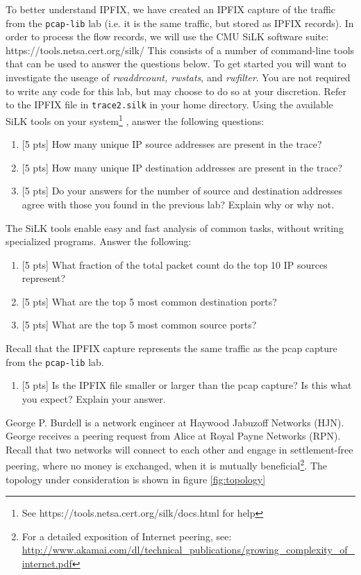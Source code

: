 To better understand IPFIX, we have created an IPFIX capture of the traffic from the {\tt pcap-lib} lab (i.e. it is the same traffic, but stored as IPFIX records).
In order to process the flow records, we will use the CMU SiLK software suite:
   https://tools.netsa.cert.org/silk/
This consists of a number of command-line tools that can be used to answer the questions below. To get started you will want to investigate the useage of \textit{rwaddrcount, rwstats}, and \textit{rwfilter}. You are not required to write any code for this lab, but may choose to do so at your discretion.
Refer to the IPFIX file in {\tt trace2.silk} in your home directory.
Using the available SiLK tools on your system\footnote{See https://tools.netsa.cert.org/silk/docs.html for help}
, answer the following questions:
\begin{enumerate}[resume]
\item {[5 pts]} How many unique IP source addresses are present in the trace?
\item {[5 pts]} How many unique IP destination addresses are present in the trace?
\item {[5 pts]} Do your answers for the number of source and destination addresses agree with those you found in the previous lab? Explain why or why not.
\end{enumerate}
The SiLK tools enable easy and fast analysis of common tasks, without writing specialized programs. Answer the following:
\begin{enumerate}[resume]
\item {[5 pts]} What fraction of the total packet count do the top 10 IP sources represent? 
\item {[5 pts]} What are the top 5 most common destination ports?
\item {[5 pts]} What are the top 5 most common source ports?
\end{enumerate}
Recall that the IPFIX capture represents the same traffic as the pcap capture from the {\tt pcap-lib} lab.
\begin{enumerate}[resume]
\item {[5 pts]} Is the IPFIX file smaller or larger than the pcap capture? Is this what you expect? Explain your answer.
\end{enumerate}
  
George P. Burdell is a network engineer at Haywood Jabuzoff Networks (HJN). George receives a peering request from Alice at Royal Payne Networks (RPN). Recall that two networks will connect to each other and engage in settlement-free peering, where no money is exchanged, when it is mutually beneficial\footnote{For a detailed exposition of Internet peering, see: \url{http://www.akamai.com/dl/technical\_publications/growing\_complexity\_of\_internet.pdf}}.
The topology under consideration is shown in figure \ref{fig:topology}


